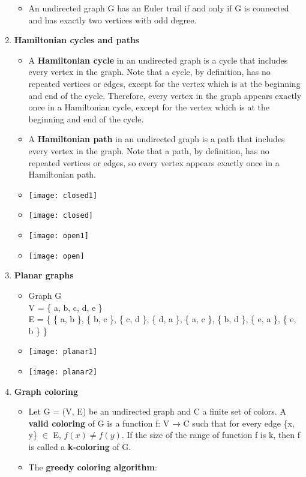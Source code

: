 \documentclass[12pt,a4paper]{article}
\begin{document}
\begin{enumerate}
\begin{itemize}
    \item An undirected graph G has an Euler trail if and only if G is connected and has exactly two vertices with odd degree.
  \end{itemize}
  \item \textbf{Hamiltonian cycles and paths}
  \begin{itemize}
    \item A \textbf{Hamiltonian cycle} in an undirected graph is a cycle that includes every vertex in the graph. Note that a cycle, by definition, has no repeated vertices or edges, except for the vertex which is at the beginning and end of the cycle. Therefore, every vertex in the graph appears exactly once in a Hamiltonian cycle, except for the vertex which is at the beginning and end of the cycle.
    \item A \textbf{Hamiltonian path} in an undirected graph is a path that includes every vertex in the graph. Note that a path, by definition, has no repeated vertices or edges, so every vertex appears exactly once in a Hamiltonian path.
    \item[] \texttt{[image: closed1]}
    \item[] \texttt{[image: closed]}
    \item[] \texttt{[image: open1]} 
    \item[] \texttt{[image: open]}    
  \end{itemize}
  \item \textbf{Planar graphs}
  \begin{itemize}
    \item Graph G\\V = \{ a, b, c, d, e \} \\E = \{ \{ a, b \}, \{ b, c \}, \{ c, d \}, \{ d, a \}, \{ a, c \}, \{ b, d \}, \{ e, a \}, \{ e, b \} \}
    \item[] \texttt{[image: planar1]}
    \item[] \texttt{[image: planar2]}
  \end{itemize}
  \item \textbf{Graph coloring}
  \begin{itemize}
    \item Let G = (V, E) be an undirected graph and C a finite set of colors. A \textbf{valid coloring} of G is a function f: V → C such that for every edge \{x, y\} \(\in \) E, \(f(x) \neq f(y)\). If the size of the range of function f is k, then f is called a \textbf{k-coloring} of G.
    \item The \textbf{greedy coloring algorithm}:

\end{itemize}
\end{enumerate}
\end{document}
